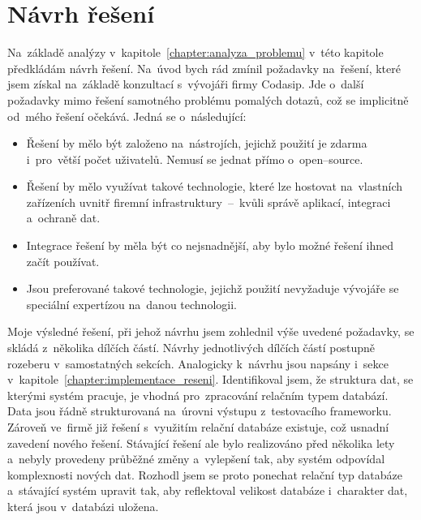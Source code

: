 \chapter{Návrh řešení}
\label{chapter:navrh}
Na~základě analýzy v~kapitole~\ref{chapter:analyza_problemu} v~této kapitole předkládám návrh řešení. Na~úvod bych
rád zmínil požadavky na~řešení, které jsem získal na~základě konzultací s~vývojáři firmy Codasip. Jde o~další
požadavky mimo řešení samotného problému pomalých dotazů, což se implicitně od~mého řešení očekává. Jedná se o~následující:
\begin{itemize}
    \item Řešení by mělo být založeno na~nástrojích, jejichž použití je zdarma i~pro~větší počet uživatelů. Nemusí se jednat přímo o~open--source.
    \item Řešení by mělo využívat takové technologie, které lze hostovat na~vlastních zařízeních uvnitř firemní infrastruktury~--~kvůli správě aplikací, integraci a~ochraně dat.
    \item Integrace řešení by měla být co nejsnadnější, aby bylo možné řešení ihned začít používat.
    \item Jsou preferované takové technologie, jejichž použití nevyžaduje vývojáře se speciální expertízou na~danou technologii.
\end{itemize}

Moje výsledné řešení, při jehož návrhu jsem zohlednil výše uvedené požadavky, se skládá z~několika dílčích částí.
Návrhy jednotlivých dílčích částí postupně rozeberu v~samostatných sekcích. Analogicky k~návrhu jsou napsány i~sekce
v~kapitole~\ref{chapter:implementace_reseni}. Identifikoval jsem, že struktura dat, se kterými systém pracuje, je
vhodná pro~zpracování relačním typem databází. Data jsou řádně strukturovaná na~úrovni výstupu z~testovacího
frameworku. Zároveň ve~firmě již řešení s~využitím relační databáze existuje, což usnadní zavedení nového řešení.
Stávající řešení ale bylo realizováno před několika lety a~nebyly provedeny průběžné změny a~vylepšení tak, aby
systém odpovídal komplexnosti nových dat. Rozhodl jsem se proto ponechat relační typ databáze a~stávající systém
upravit tak, aby reflektoval velikost databáze i~charakter dat, která jsou v~databázi uložena.

